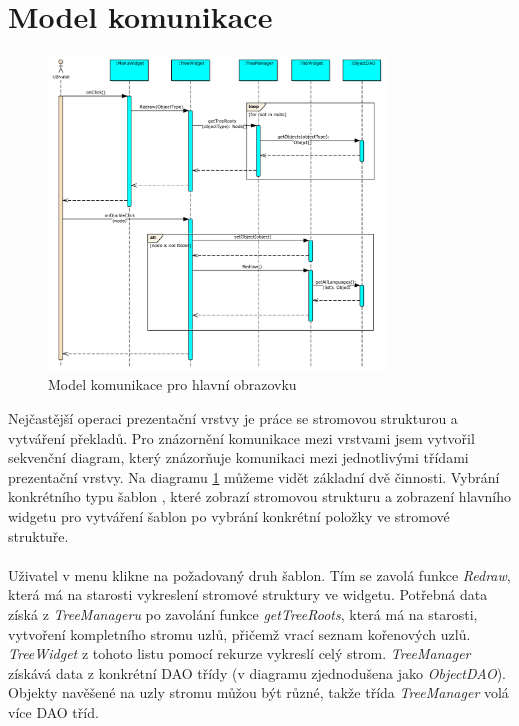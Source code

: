 \documentclass[thesis=B,czech]{resources/FITthesis}[2012/06/26]
\begin{document}
	\section{Model komunikace}
	\begin{figure}\centering
	\includegraphics[width=0.8\textwidth]{images/comunication_main}
	\caption[Model komunikace pro hlavní obrazovku]{Model komunikace pro hlavní obrazovku}\label{fig:comunication_main}
	\end{figure}
Nejčastější operaci prezentační vrstvy je práce se stromovou strukturou a vytváření překladů. Pro znázornění komunikace mezi vrstvami jsem vytvořil sekvenční diagram, který znázorňuje komunikaci mezi jednotlivými třídami prezentační vrstvy. Na diagramu \ref{fig:comunication_main} můžeme vidět základní dvě činnosti. Vybrání konkrétního typu šablon , které zobrazí stromovou strukturu a zobrazení hlavního widgetu pro vytváření šablon po vybrání konkrétní položky ve stromové struktuře.\\
\\
Uživatel v menu klikne na požadovaný druh šablon. Tím se zavolá funkce \textit{Redraw}, která má na starosti vykreslení stromové struktury ve widgetu. Potřebná data získá z \textit{TreeManageru} po zavolání funkce \textit{getTreeRoots}, která má na starosti, vytvoření kompletního stromu uzlů, přičemž vrací seznam kořenových uzlů. \textit{TreeWidget} z tohoto listu pomocí rekurze vykreslí celý strom. \textit{TreeManager} získává data z konkrétní DAO třídy (v diagramu zjednodušena jako \textit{ObjectDAO}). Objekty navěšené na uzly stromu můžou být různé, takže třída \textit{TreeManager} volá více DAO tříd.\\
\end{document}
